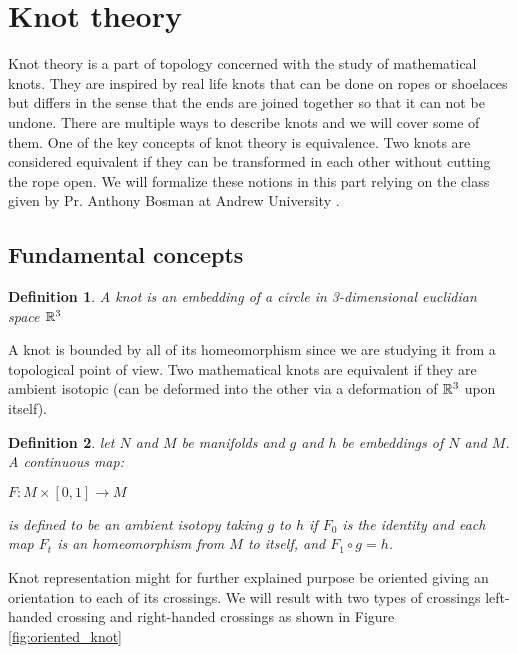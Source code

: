 \documentclass[12pt, a4paper]{article}
\newtheorem{definition}{Definition}
\begin{document}
\section{Knot theory}

Knot theory is a part of topology concerned with the study of mathematical knots. They are inspired by real life knots  that can be done on ropes or shoelaces but differs in the sense that the ends are joined together so that it can not be undone. There are multiple ways to describe knots and we will cover some of them. One of the key concepts of knot theory is equivalence. Two knots are considered equivalent if they can be transformed in each other without cutting the rope open. We will formalize these notions in this part relying on the class given by Pr. Anthony Bosman at Andrew University \cite{anthony_bosman_knot_2019}.

\subsection{Fundamental concepts}

\begin{definition}
  A knot is an embedding of a circle in 3-dimensional euclidian space $\mathbb{R}^3$
\end{definition}

A knot is bounded by all of its homeomorphism since we are studying it from a topological point of view. Two mathematical knots are equivalent if they are ambient isotopic (can be deformed into the other via a deformation of $\mathbb{R}^3$ upon itself).\\

\begin{definition}
  let $N$ and $M$ be manifolds and $g$ and $h$ be embeddings of $N$ and $M$. A continuous map:
   \begin{center}
     $F: M \times [0,1] \to M$
   \end{center}
  is defined to be an ambient isotopy taking $g$ to $h$ if $F_0$ is the identity and each map $F_t$ is an homeomorphism from $M$ to itself, and $F_1 \circ g = h$.
\end{definition}

Knot representation might for further explained purpose be oriented giving an orientation to each of its crossings. We will result with two types of crossings left-handed crossing and right-handed crossings as shown in Figure \ref{fig:oriented_knot}
\end{document}
